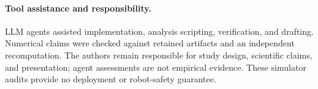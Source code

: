 \documentclass{article}
\begin{document}
\paragraph{Tool assistance and responsibility.}
LLM agents assisted implementation, analysis scripting, verification, and
drafting. Numerical claims were checked against retained artifacts and an
independent recomputation. The authors remain responsible for study design,
scientific claims, and presentation; agent assessments are not empirical
evidence. These simulator audits provide no deployment or robot-safety guarantee.
\end{document}

